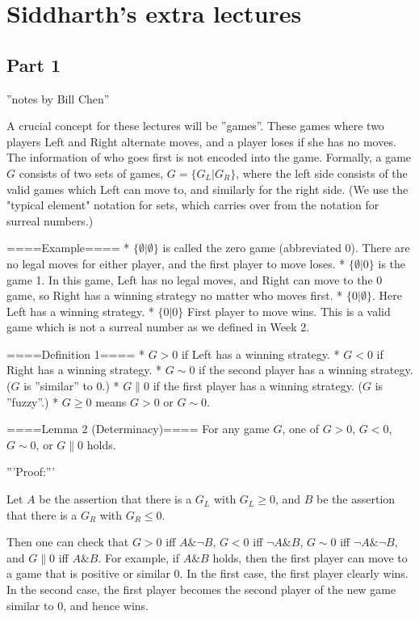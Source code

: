 \section{ Siddharth's extra lectures }

\subsection{Part 1}
''notes by Bill Chen''

A crucial concept for these lectures will be ''games''. These games where two players Left and Right alternate moves, and a player loses if she has no moves. The information of who goes first is not encoded into the game. Formally, a game $G$ consists of two sets of games, $G=\{G_L|G_R\}$, where the left side consists of the valid games which Left can move to, and similarly for the right side. (We use the "typical element" notation for sets, which carries over from the notation for surreal numbers.)

====Example====
* $\{\emptyset|\emptyset\}$ is called the zero game (abbreviated 0). There are no legal moves for either player, and the first player to move loses.
* $\{\emptyset|0\}$ is the game 1. In this game, Left has no legal moves, and Right can move to the 0 game, so Right has a winning strategy no matter who moves first.
* $\{0|\emptyset\}$. Here Left has a winning strategy.
* $\{0|0\}$ First player to move wins. This is a valid game which is not a surreal number as we defined in Week 2.

====Definition 1====
* $G>0$ if Left has a winning strategy.
* $G<0$ if Right has a winning strategy.
* $G\sim 0$ if the second player has a winning strategy. ($G$ is ''similar'' to $0$.)
* $G\parallel 0$ if the first player has a winning strategy. ($G$ is ''fuzzy''.)
* $G\ge 0$ means $G>0$ or $G\sim 0$.

====Lemma 2 (Determinacy)====
For any game $G$, one of $G>0$, $G<0$, $G\sim 0$, or $G\parallel 0$ holds.

'''Proof:'''

Let $A$ be the assertion that there is a $G_L$ with $G_L\ge 0$, and $B$ be the assertion that there is a $G_R$ with $G_R\le 0$.

Then one can check that $G>0$ iff $A\& \neg B$, $G<0$ iff $\neg A \& B$, $G\sim 0$ iff $\neg A \& \neg B$, and $G\parallel 0$ iff $A\& B$. For example, if $A \& B$ holds, then the first player can move to a game that is positive or similar $0$. In the first case, the first player clearly wins. In the second case, the first player becomes the second player of the new game similar to $0$, and hence wins.

